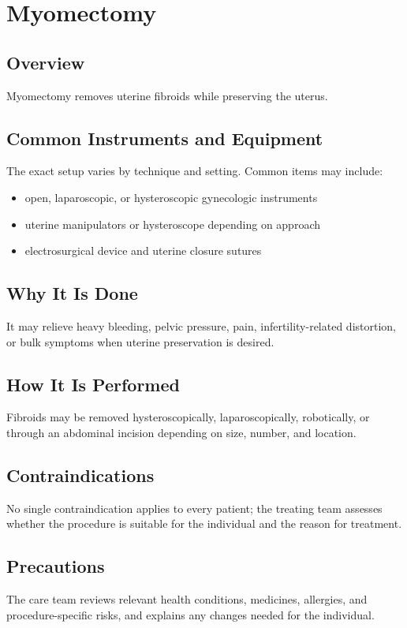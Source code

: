 \chapter{Myomectomy}
\section*{Overview}
Myomectomy removes uterine fibroids while preserving the uterus.
\section*{Common Instruments and Equipment}
The exact setup varies by technique and setting. Common items may include:
\begin{itemize}[nosep,leftmargin=*]
  \item open, laparoscopic, or hysteroscopic gynecologic instruments
  \item uterine manipulators or hysteroscope depending on approach
  \item electrosurgical device and uterine closure sutures
\end{itemize}

\section*{Why It Is Done}
It may relieve heavy bleeding, pelvic pressure, pain, infertility-related distortion, or bulk symptoms when uterine preservation is desired.
\section*{How It Is Performed}
Fibroids may be removed hysteroscopically, laparoscopically, robotically, or through an abdominal incision depending on size, number, and location.
\section*{Contraindications}
No single contraindication applies to every patient; the treating team assesses whether the procedure is suitable for the individual and the reason for treatment.

\section*{Precautions}
The care team reviews relevant health conditions, medicines, allergies, and procedure-specific risks, and explains any changes needed for the individual.


